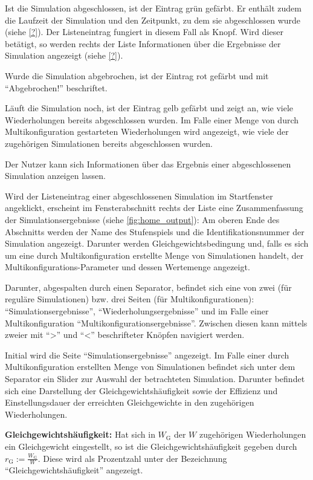 \documentclass[parskip=full,11pt]{scrartcl}
\begin{document}
Ist die Simulation abgeschlossen, ist der Eintrag grün gefärbt. Er enthält zudem die Laufzeit der Simulation und den Zeitpunkt, zu dem sie abgeschlossen wurde (siehe \cref{?}). Der Listeneintrag fungiert in diesem Fall als Knopf. Wird dieser betätigt, so werden rechts der Liste Informationen über die Ergebnisse der Simulation angezeigt (siehe \cref{?}).

Wurde die Simulation abgebrochen, ist der Eintrag rot gefärbt und mit \enquote{Abgebrochen!} beschriftet.

Läuft die Simulation noch, ist der Eintrag gelb gefärbt und zeigt an, wie viele Wiederholungen bereits abgeschlossen wurden. Im Falle einer Menge von durch Multikonfiguration gestarteten Wiederholungen wird angezeigt, wie viele der zugehörigen Simulationen bereits abgeschlossen wurden.

Der Nutzer kann sich Informationen über das Ergebnis einer abgeschlossenen Simulation anzeigen lassen.

Wird der Listeneintrag einer abgeschlossenen Simulation im Startfenster angeklickt, erscheint im Fensterabschnitt rechts der Liste eine Zusammenfassung der Simulationsergebnisse (siehe \cref{fig:home_output}): Am oberen Ende des Abschnitts werden der Name des Stufenspiels und die Identifikationsnummer der Simulation angezeigt. Darunter werden Gleichgewichtsbedingung und, falls es sich um eine durch Multikonfiguration erstellte Menge von Simulationen handelt, der Multikonfigurations-Parameter und dessen Wertemenge angezeigt.

Darunter, abgespalten durch einen Separator, befindet sich eine von zwei (für reguläre Simulationen) bzw. drei Seiten (für Multikonfigurationen): \enquote{Simulationsergebnisse}, \enquote{Wiederholungsergebnisse} und im Falle einer Multikonfiguration \enquote{Multikonfigurationsergebnisse}. Zwischen diesen kann mittels zweier mit \enquote{>} und \enquote{<} beschrifteter Knöpfen navigiert werden.

Initial wird die Seite \enquote{Simulationsergebnisse} angezeigt. Im Falle einer durch Multikonfiguration erstellten Menge von Simulationen befindet sich unter dem Separator ein Slider zur Auswahl der betrachteten Simulation. Darunter befindet sich eine Darstellung der Gleichgewichtshäufigkeit sowie der Effizienz und Einstellungsdauer der erreichten Gleichgewichte in den zugehörigen Wiederholungen.

\textbf{Gleichgewichtshäufigkeit:}
Hat sich in \(W_\text{G}\) der \(W\) zugehörigen Wiederholungen ein Gleichgewicht eingestellt, so ist die Gleichgewichtshäufigkeit gegeben durch \(r_\text{G} := \frac{W_\text{G}}{W}\). Diese wird als Prozentzahl unter der Bezeichnung \enquote{Gleichgewichtshäufigkeit} angezeigt.
\end{document}
